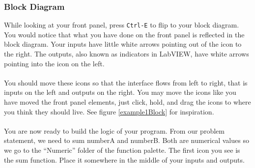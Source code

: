 	\subsubsection{Block Diagram}
	While looking at your front panel, press \texttt{Ctrl-E} to flip to your block diagram. You would notice that what you have done on the front panel is reflected in the block diagram. Your inputs have little white arrows pointing out of the icon to the right. The outputs, also known as indicators in LabVIEW, have white arrows pointing into the icon on the left.\\
	\\
	You should move these icons so that the interface flows from left to right, that is inputs on the left and outputs on the right. You may move the icons like you have moved the front panel elements, just click, hold, and drag the icons to where you think they should live. See figure \ref{example1Block} for inspiration.\\
	\\
	You are now ready to build the logic of your program. From our problem statement, we need to sum numberA and numberB. Both are numerical values so we go to the ``Numeric'' folder of the function palette. The first icon you see is the sum function. Place it somewhere in the middle of your inputs and outputs.\\
	
	